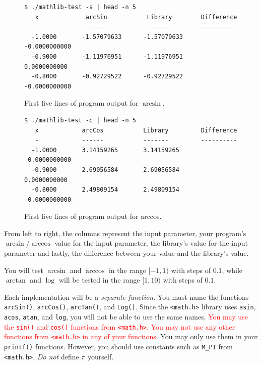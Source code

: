 \documentclass[11pt]{article}
\begin{document}
\begin{figure}[h]
\begin{centering}
  \begin{lstlisting}[style=bashstyle]
 $ ./mathlib-test -s | head -n 5
   x             arcSin           Library        Difference
   -             ------           -------        ----------
  -1.0000       -1.57079633      -1.57079633    -0.0000000000
  -0.9000       -1.11976951      -1.11976951     0.0000000000
  -0.8000       -0.92729522      -0.92729522    -0.0000000000\end{lstlisting}
  \caption{First five lines of program output for $\arcsin$.}\label{sine}
\end{centering}
\end{figure}

\begin{figure}[h]
\begin{centering}
  \begin{lstlisting}[style=bashstyle]
 $ ./mathlib-test -c | head -n 5
   x            arcCos           Library         Difference
   -            ------           -------         ----------
  -1.0000       3.14159265       3.14159265     -0.0000000000
  -0.9000       2.69056584       2.69056584      0.0000000000
  -0.8000       2.49809154       2.49809154     -0.0000000000\end{lstlisting}
  \caption{First five lines of program output for arccos.}\label{cosine}
\end{centering}
\end{figure}

From left to right, the columns represent the input parameter, your
program's $\arcsin$/$\arccos$ value for the input parameter, the
library's value for the input parameter and lastly, the difference
between your value and the library's value.

You will test $\arcsin$ and $\arccos$ in the range $[-1, 1)$
with steps of $0.1$, while $\arctan$ and $\log$ will be tested in the
range $[1, 10)$ with steps of $0.1$.

Each implementation will be a \emph{separate function}. You must name
the functions \texttt{arcSin()}, \texttt{arcCos()}, \texttt{arcTan()}, and
\texttt{Log()}. Since the \texttt{<math.h>} library uses \texttt{asin},
\texttt{acos}, \texttt{atan}, and \texttt{log}, you will not be able to
use the same names. \textcolor{red}{You may use the \texttt{sin()} and
\texttt{cos()} functions from \texttt{<math.h>}. You may not use any
other functions from \texttt{<math.h>} in any of your functions.} You
may only use them in your \texttt{printf()} functions.  However, you
should use constants such as \texttt{M\_PI} from \texttt{<math.h>}.
\emph{Do not} define $\pi$ yourself.
\end{document}
